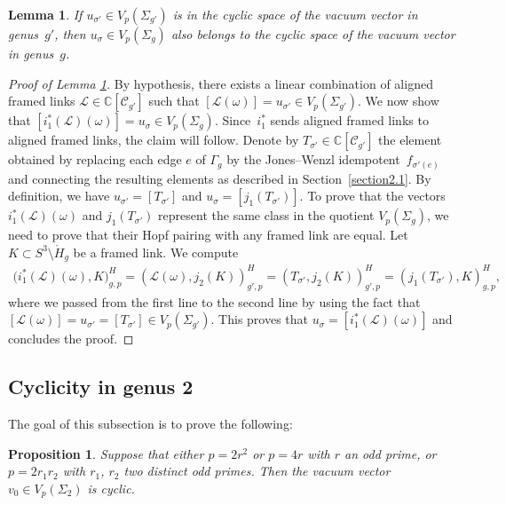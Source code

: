 \documentclass[11pt]{article}
\numberwithin{equation}{section}
\newtheorem{Lemma}[Theorem]{Lemma}
\newtheorem{Proposition}[Theorem]{Proposition}
\begin{document}
\begin{Lemma}\label{lemma_reduction}If $u_{\sigma'}\in V_p(\Sigma_{g'})$ is in the cyclic space of the vacuum vector in genus~$g'$, then $u_{\sigma}\in V_p(\Sigma_g)$ also belongs to the cyclic space of the vacuum vector in genus~$g$.
\end{Lemma}

\begin{proof}[Proof of Lemma \ref{lemma_reduction}]
By hypothesis, there exists a linear combination of aligned framed links $\mathcal{L}\in \mathbb{C}[\mathcal{C}_{g'}]$ such that $[\mathcal{L}(\omega)]= u_{\sigma'} \in V_p(\Sigma_{g'})$. We now show that $[i_1^*(\mathcal{L})(\omega)]=u_{\sigma}\in V_p(\Sigma_g)$. Since~$i_1^*$ sends aligned framed links to aligned framed links, the claim will follow. Denote by \mbox{$T_{\sigma'}\in \mathbb{C}[\mathcal{C}_{g'}]$} the element obtained by replacing each edge $e$ of $\Gamma_g$ by the Jones--Wenzl idempotent~$f_{\sigma'(e)}$ and connecting the resulting elements as described in Section~\ref{section2.1}. By definition, we have $u_{\sigma'}=[T_{\sigma'}]$ and $u_{\sigma}=[j_1 ( T_{\sigma'})]$. To prove that the vectors $i_1^*(\mathcal{L})(\omega)$ and $j_1 ( T_{\sigma'})$ represent the same class in the quotient $V_p(\Sigma_g)$, we need to prove that their Hopf pairing with any framed link are equal. Let $K\subset S^3\setminus \mathring{H}_g$ be a framed link. We compute
\begin{gather*}
\big( i_1^*(\mathcal{L})(\omega), K \big)^H_{g, p} = ( \mathcal{L}(\omega), j_2(K) )^H_{g', p} = ( T_{\sigma'}, j_2(K) )^H_{g',p}= ( j_1(T_{\sigma'}), K )^H_{g,p},
\end{gather*}
where we passed from the first line to the second line by using the fact that $[\mathcal{L}(\omega)]=u_{\sigma'}= [T_{\sigma'}]\in V_p(\Sigma_{g'})$. This proves that $u_{\sigma}=[i_1^*(\mathcal{L})(\omega)]$ and concludes the proof.
\end{proof}

\subsection{Cyclicity in genus 2}
The goal of this subsection is to prove the following:
\begin{Proposition}\label{prop_cyclicity_high_genus}
Suppose that either $p=2r^2$ or $p=4r$ with $r$ an odd prime, or $p=2r_1r_2$ with $r_1$, $r_2$ two distinct odd primes. Then the vacuum vector $v_0\in V_p(\Sigma_2)$ is cyclic.
\end{Proposition}
\end{document}
